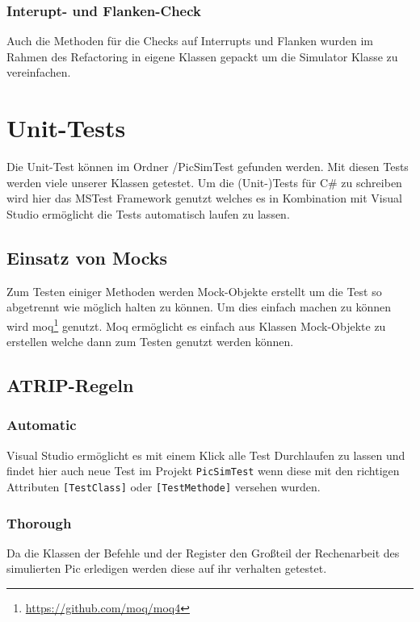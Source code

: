 \documentclass[12pt,a4paper,titlepage,ngerman,pdftex]{report}
\begin{document}
    \subsubsection{Interupt- und Flanken-Check}
   	Auch die Methoden für die Checks auf Interrupts und Flanken wurden im Rahmen des Refactoring in eigene Klassen gepackt um die Simulator Klasse zu vereinfachen.
   
   
   	\section{Unit-Tests}
    Die Unit-Test können im Ordner /PicSimTest gefunden werden. 
	Mit diesen Tests werden viele unserer Klassen getestet.
	Um die (Unit-)Tests für C\# zu schreiben wird hier das MSTest Framework genutzt welches es in Kombination mit Visual Studio ermöglicht die Tests automatisch laufen zu lassen.

    \subsection{Einsatz von Mocks}
    Zum Testen einiger Methoden werden Mock-Objekte erstellt um die Test so abgetrennt wie möglich halten zu können.
	Um dies einfach machen zu können wird moq\footnote{\url{https://github.com/moq/moq4}} genutzt.
	Moq ermöglicht es einfach aus Klassen Mock-Objekte zu erstellen welche dann zum Testen genutzt werden können.
	
    \subsection{ATRIP-Regeln}
	\label{subsec:atrip-regeln}

    \subsubsection{Automatic}
	Visual Studio ermöglicht es mit einem Klick alle Test Durchlaufen zu lassen und findet hier auch neue Test im Projekt \verb|PicSimTest| wenn diese mit den richtigen Attributen \verb|[TestClass]| oder \verb|[TestMethode]| versehen wurden.
	
    \subsubsection{Thorough}\label{subsec:thorough}
    Da die Klassen der Befehle und der Register den Großteil der Rechenarbeit des simulierten Pic erledigen werden diese auf ihr verhalten getestet.
    
\end{document}
